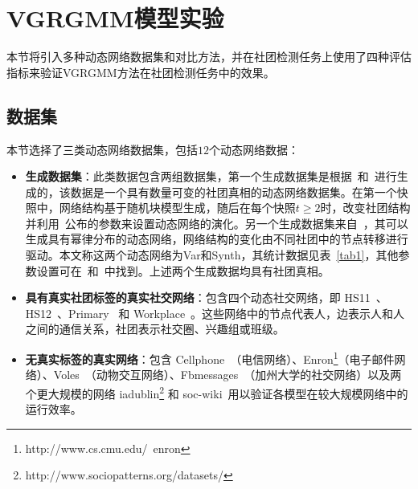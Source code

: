 \section{VGRGMM模型实验\label{chap6:experiment}}

本节将引入多种动态网络数据集和对比方法，并在社团检测任务上使用了四种评估指标来验证VGRGMM方法在社团检测任务中的效果。

\subsection{数据集}
本节选择了三类动态网络数据集，包括$12$个动态网络数据：
\begin{itemize}
    \item \textbf{生成数据集}：此类数据包含两组数据集，第一个生成数据集是根据~\cite{kim2009particle}和~\cite{Lin.2009.Tseng}进行生成的，该数据是一个具有数量可变的社团真相的动态网络数据集。在第一个快照中，网络结构基于随机块模型生成，随后在每个快照$t \ge 2$时，改变社团结构并利用~\cite{Lin.2009.Tseng}公布的参数来设置动态网络的演化。另一个生成数据集来自~\cite{ditursi2017local}，其可以生成具有幂律分布的动态网络，网络结构的变化由不同社团中的节点转移进行驱动。本文称这两个动态网络为Var和Synth，其统计数据见表~\ref{tab1}，其他参数设置可在~\cite{kim2009particle}和~\cite{Lin.2009.Tseng}中找到。上述两个生成数据均具有社团真相。
    \item \textbf{具有真实社团标签的真实社交网络}：包含四个动态社交网络，即 HS11~\cite{stehle2011high}、HS12~\cite{stehle2011high}、Primary~\cite{stehle2011high} 和 Workplace~\cite{genois2014data}。这些网络中的节点代表人，边表示人和人之间的通信关系，社团表示社交圈、兴趣组或班级。
    \item \textbf{无真实标签的真实网络}：包含 Cellphone~\cite{folino2013evolutionary}（电信网络）、Enron\footnote{http://www.cs.cmu.edu/~enron}（电子邮件网络）、Voles~\cite{rossi2015network}（动物交互网络）、Fbmessages~\cite{rossi2015network}（加州大学的社交网络）以及两个更大规模的网络 iadublin\footnote{http://www.sociopatterns.org/datasets/} 和 soc-wiki~\cite{rossi2015network}用以验证各模型在较大规模网络中的运行效率。
\end{itemize}

